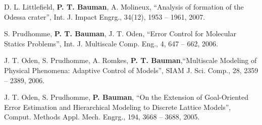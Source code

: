 \blankline


D. L. Littlefield, \textbf{P. T. Bauman}, A. Molineux, ``Analysis of formation of the Odessa crater'', Int. J. Impact Engrg., 34(12), 1953 -- 1961, 2007.

\blankline

S. Prudhomme, \textbf{P. T. Bauman}, J. T. Oden, ``Error Control for Molecular Statics Problems'', Int. J. Multiscale Comp. Eng., 4, 647 -- 662, 2006.

\blankline

J. T. Oden, S. Prudhomme, A. Romkes, \textbf{P. T. Bauman},``Multiscale Modeling of Physical Phenomena: Adaptive Control of Models'', SIAM J. Sci. Comp., 28, 2359 -- 2389, 2006.

\blankline

J. T. Oden, S. Prudhomme, \textbf{P. Bauman}, ``On the Extension of Goal-Oriented Error Estimation and Hierarchical Modeling to Discrete Lattice Models'', Comput. Methods Appl. Mech. Engrg., 194, 3668 -- 3688, 2005.



